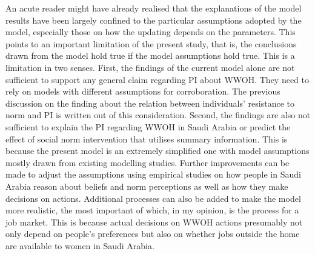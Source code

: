 \documentclass[
  11pt,
]{article}
\begin{document}
An acute reader might have already realised that the explanations of the
model results have been largely confined to the particular assumptions
adopted by the model, especially those on how the updating depends on
the parameters. This points to an important limitation of the present
study, that is, the conclusions drawn from the model hold true if the
model assumptions hold true. This is a limitation in two senses. First,
the findings of the current model alone are not sufficient to support
any general claim regarding PI about WWOH. They need to rely on models
with different assumptions for corroboration. The previous discussion on
the finding about the relation between individuals' resistance to norm
and PI is written out of this consideration. Second, the findings are
also not sufficient to explain the PI regarding WWOH in Saudi Arabia or
predict the effect of social norm intervention that utilises summary
information. This is because the present model is an extremely
simplified one with model assumptions mostly drawn from existing
modelling studies. Further improvements can be made to adjust the
assumptions using empirical studies on how people in Saudi Arabia reason
about beliefs and norm perceptions as well as how they make decisions on
actions. Additional processes can also be added to make the model more
realistic, the most important of which, in my opinion, is the process
for a job market. This is because actual decisions on WWOH actions
presumably not only depend on people's preferences but also on whether
jobs outside the home are available to women in Saudi Arabia.
\end{document}
